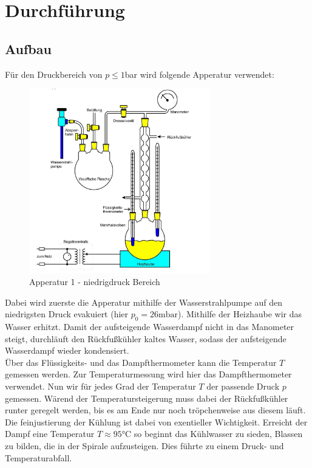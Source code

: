 \section{Durchführung}
\label{sec:Durchfuehrung}
\subsection{Aufbau}
Für den Druckbereich von $p\leq 1$bar wird folgende Apperatur verwendet:
\begin{figure}[H]
    \centering
    \includegraphics[width=0.7\textwidth]{bilder/anlage1.jpg}
    \caption{Apperatur 1 - niedrigdruck Bereich \cite[181]{Anleitung}}
    \label{fig:app1}
\end{figure}
Dabei wird zuerste die Apperatur mithilfe der Wasserstrahlpumpe auf
den niedrigsten Druck evakuiert (hier $p_0=26\mathrm{mbar}$).
Mithilfe der Heizhaube wir das Wasser erhitzt. Damit der aufsteigende Wasserdampf
nicht in das Manometer steigt, durchläuft den Rückfußkühler kaltes Wasser,
sodass der aufsteigende Wasserdampf wieder kondensiert.\\
Über das Flüssigkeits- und das Dampfthermometer kann die Temperatur $T$ gemessen werden.
Zur Temperaturmessung wird hier das Dampfthermometer verwendet. 
Nun wir für jedes Grad der Temperatur $T$ der passende Druck $p$ gemessen.
Wärend der Temperatursteigerung muss dabei der Rückfußkühler runter geregelt werden, bis es am
Ende nur noch tröpchenweise aus diesem läuft.\\
Die feinjustierung der Kühlung ist dabei von exentieller Wichtigkeit.
Erreicht der Dampf eine Temperatur $T \approx 95°$C so beginnt
das Kühlwasser zu sieden, Blassen zu bilden, die in der Spirale
aufzusteigen. Dies führte zu einem Druck- und Temperaturabfall.\\

